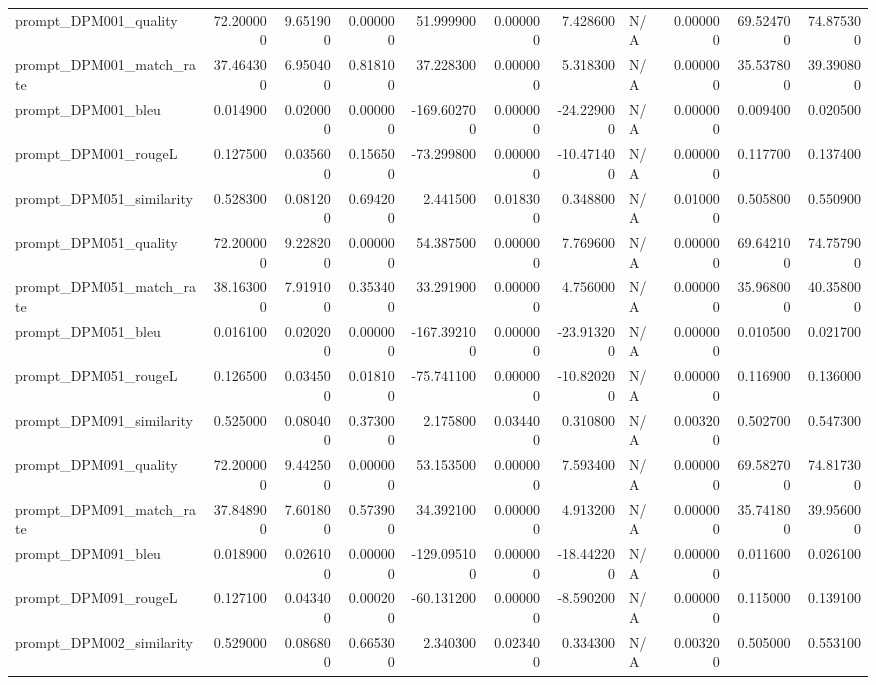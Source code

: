 \begin{tabular}{lrrrrrrlrrr}
prompt_DPM001_quality & 72.200000 & 9.651900 & 0.000000 & 51.999900 & 0.000000 & 7.428600 & N/A & 0.000000 & 69.524700 & 74.875300 \\
prompt_DPM001_match_rate & 37.464300 & 6.950400 & 0.818100 & 37.228300 & 0.000000 & 5.318300 & N/A & 0.000000 & 35.537800 & 39.390800 \\
prompt_DPM001_bleu & 0.014900 & 0.020000 & 0.000000 & -169.602700 & 0.000000 & -24.229000 & N/A & 0.000000 & 0.009400 & 0.020500 \\
prompt_DPM001_rougeL & 0.127500 & 0.035600 & 0.156500 & -73.299800 & 0.000000 & -10.471400 & N/A & 0.000000 & 0.117700 & 0.137400 \\
prompt_DPM051_similarity & 0.528300 & 0.081200 & 0.694200 & 2.441500 & 0.018300 & 0.348800 & N/A & 0.010000 & 0.505800 & 0.550900 \\
prompt_DPM051_quality & 72.200000 & 9.228200 & 0.000000 & 54.387500 & 0.000000 & 7.769600 & N/A & 0.000000 & 69.642100 & 74.757900 \\
prompt_DPM051_match_rate & 38.163000 & 7.919100 & 0.353400 & 33.291900 & 0.000000 & 4.756000 & N/A & 0.000000 & 35.968000 & 40.358000 \\
prompt_DPM051_bleu & 0.016100 & 0.020200 & 0.000000 & -167.392100 & 0.000000 & -23.913200 & N/A & 0.000000 & 0.010500 & 0.021700 \\
prompt_DPM051_rougeL & 0.126500 & 0.034500 & 0.018100 & -75.741100 & 0.000000 & -10.820200 & N/A & 0.000000 & 0.116900 & 0.136000 \\
prompt_DPM091_similarity & 0.525000 & 0.080400 & 0.373000 & 2.175800 & 0.034400 & 0.310800 & N/A & 0.003200 & 0.502700 & 0.547300 \\
prompt_DPM091_quality & 72.200000 & 9.442500 & 0.000000 & 53.153500 & 0.000000 & 7.593400 & N/A & 0.000000 & 69.582700 & 74.817300 \\
prompt_DPM091_match_rate & 37.848900 & 7.601800 & 0.573900 & 34.392100 & 0.000000 & 4.913200 & N/A & 0.000000 & 35.741800 & 39.956000 \\
prompt_DPM091_bleu & 0.018900 & 0.026100 & 0.000000 & -129.095100 & 0.000000 & -18.442200 & N/A & 0.000000 & 0.011600 & 0.026100 \\
prompt_DPM091_rougeL & 0.127100 & 0.043400 & 0.000200 & -60.131200 & 0.000000 & -8.590200 & N/A & 0.000000 & 0.115000 & 0.139100 \\
prompt_DPM002_similarity & 0.529000 & 0.086800 & 0.665300 & 2.340300 & 0.023400 & 0.334300 & N/A & 0.003200 & 0.505000 & 0.553100 \\

\end{tabular}
